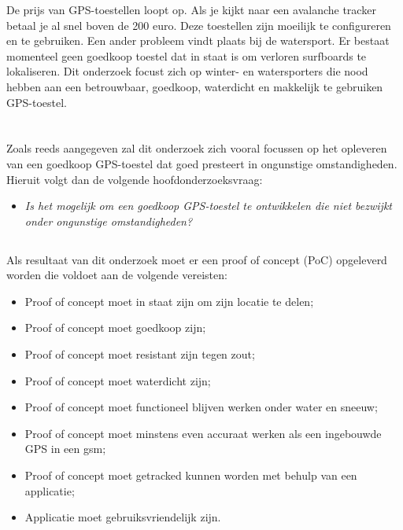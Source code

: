 De prijs van GPS-toestellen loopt op. Als je kijkt naar een avalanche tracker betaal je al snel boven de 200 euro. Deze toestellen zijn moeilijk te configureren en te gebruiken. Een ander probleem vindt plaats bij de watersport. Er bestaat momenteel geen goedkoop toestel dat in staat is om verloren surfboards te lokaliseren. Dit onderzoek focust zich op winter- en watersporters die nood hebben aan een betrouwbaar, goedkoop, waterdicht en makkelijk te gebruiken GPS-toestel.

\section{}
\subsection{}
\label{sec:onderzoeksvraag}

Zoals reeds aangegeven zal dit onderzoek zich vooral focussen op het opleveren van een goedkoop GPS-toestel dat goed presteert in ongunstige omstandigheden. Hieruit volgt dan de volgende hoofdonderzoeksvraag:
\newline
\begin{itemize}
	\item[] \textit{Is het mogelijk om een goedkoop GPS-toestel te ontwikkelen die niet bezwijkt onder ongunstige omstandigheden?}
\end{itemize}

\subsection{}
Als resultaat van dit onderzoek moet er een proof of concept (PoC) opgeleverd worden die voldoet aan de volgende vereisten:
\begin{itemize}
	\item Proof of concept moet in staat zijn om zijn locatie te delen;
	\item Proof of concept moet goedkoop zijn;
	\item Proof of concept moet resistant zijn tegen zout;
	\item Proof of concept moet waterdicht zijn;
    \item Proof of concept moet functioneel blijven werken  onder water en sneeuw;
	\item Proof of concept moet minstens even accuraat werken als een ingebouwde GPS in een gsm;
	\item Proof of concept moet getracked kunnen worden met behulp van een applicatie;
	\item Applicatie moet gebruiksvriendelijk zijn.
\end{itemize}

